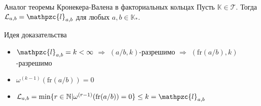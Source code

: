 \documentclass[8pt, xcolor=x11names]{beamer}
\begin{document}
\begin{frame}
    \begin{block}{Аналог теоремы Кронекера-Валена в факториальных кольцах}
        Пусть $\mathbb{K}\in\mathcal{T}$.
        Тогда $\mathcal{L}_{a,b}=\mathpzc{l}_{a,b}$ для любых $a,b\in\mathbb{K}_{*}$.
    \end{block}
    
    \begin{block}{Идея доказательства}
        \begin{itemize}
            \item $\mathpzc{l}_{a,b} = k < \infty$ $\Rightarrow$ $(a/b, k)$-разрешимо $\Rightarrow$ $(\textrm{fr}(a/b), k)$-разрешимо
            
            \item $\omega^{(k-1)}(\textrm{fr}(a/b)) = 0$
            
            \item $\mathcal{L}_{a,b}=\textrm{min}\{r\in\mathbb{N}|\omega^{(r-1)}(\textrm{fr}(a/b))=0\}\le k=\mathpzc{l}_{a,b}$
        \end{itemize}
    \end{block}
\end{frame}
\end{document}
